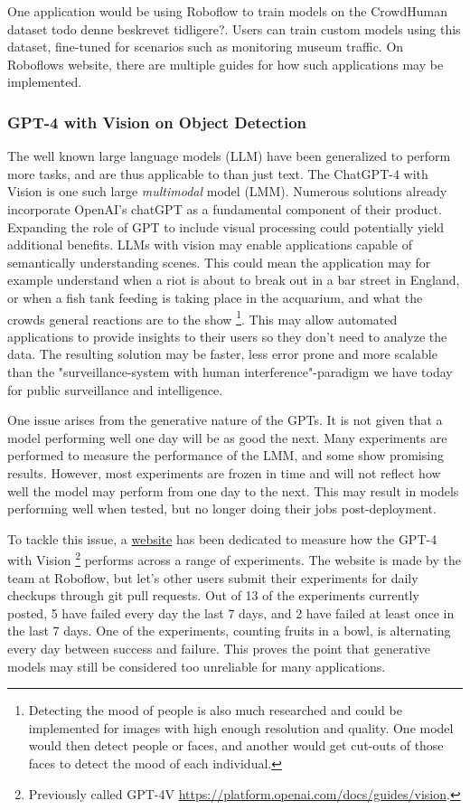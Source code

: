 One application would be using Roboflow to train models on the CrowdHuman dataset todo denne beskrevet tidligere?. Users can train custom models using this dataset, fine-tuned for scenarios such as monitoring museum traffic. On Roboflows website, there are multiple guides for how such applications may be implemented.

\subsubsection{GPT-4 with Vision on Object Detection}
The well known large language models (LLM) have been generalized to perform more tasks, and are thus applicable to than just text. The ChatGPT-4 with Vision is one such large \textit{multimodal} model (LMM). Numerous solutions already incorporate OpenAI's chatGPT as a fundamental component of their product. Expanding the role of GPT to include visual processing could potentially yield additional benefits. LLMs with vision may enable applications capable of semantically understanding scenes. This could mean the application may for example understand when a riot is about to break out in a bar street in England, or when a fish tank feeding is taking place in the acquarium, and what the crowds general reactions are to the show \footnote{Detecting the mood of people is also much researched and could be implemented for images with high enough resolution and quality. One model would then detect people or faces, and another would get cut-outs of those faces to detect the mood of each individual.}. This may allow automated applications to provide insights to their users so they don't need to analyze the data. The resulting solution may be faster, less error prone and more scalable than the "surveillance-system with human interference"-paradigm we have today for public surveillance and intelligence.

One issue arises from the generative nature of the GPTs. It is not given that a model performing well one day will be as good the next. Many experiments are performed to measure the performance of the LMM, and some show promising results. However, most experiments are frozen in time and will not reflect how well the model may perform from one day to the next. This may result in models performing well when tested, but no longer doing their jobs post-deployment.

To tackle this issue, a \href{https://www.gptcheckup.com/}{website} has been dedicated to measure how the GPT-4 with Vision \footnote{Previously called GPT-4V \href{https://platform.openai.com/docs/guides/vision}{https://platform.openai.com/docs/guides/vision}.} performs across a range of experiments. The website is made by the team at Roboflow, but let's other users submit their experiments for daily checkups through git pull requests. Out of 13 of the experiments currently posted, 5 have failed every day the last 7 days, and 2 have failed at least once in the last 7 days. One of the experiments, counting fruits in a bowl, is alternating every day between success and failure. This proves the point that generative models may still be considered too unreliable for many applications.

